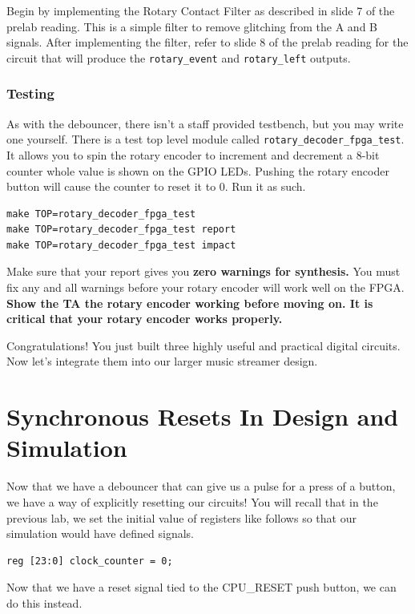 \documentclass[11pt]{article}
\begin{document}
Begin by implementing the Rotary Contact Filter as described in slide 7 of the prelab reading. This is a simple filter to remove glitching from the A and B signals. After implementing the filter, refer to slide 8 of the prelab reading for the circuit that will produce the \verb|rotary_event| and \verb|rotary_left| outputs.

\subsubsection{Testing}
As with the debouncer, there isn't a staff provided testbench, but you may write one yourself. There is a test top level module called \verb|rotary_decoder_fpga_test|. It allows you to spin the rotary encoder to increment and decrement a 8-bit counter whole value is shown on the GPIO LEDs. Pushing the rotary encoder button will cause the counter to reset it to 0. Run it as such.

\begin{verbatim}
make TOP=rotary_decoder_fpga_test
make TOP=rotary_decoder_fpga_test report
make TOP=rotary_decoder_fpga_test impact
\end{verbatim} 

Make sure that your report gives you \textbf{zero warnings for synthesis.} You must fix any and all warnings before your rotary encoder will work well on the FPGA.\\

\textbf{Show the TA the rotary encoder working before moving on. It is critical that your rotary encoder works properly.}

Congratulations! You just built three highly useful and practical digital circuits. Now let's integrate them into our larger music streamer design.

\section{Synchronous Resets In Design and Simulation}
Now that we have a debouncer that can give us a pulse for a press of a button, we have a way of explicitly resetting our circuits! You will recall that in the previous lab, we set the initial value of registers like follows so that our simulation would have defined signals.

\begin{verbatim}
reg [23:0] clock_counter = 0;
\end{verbatim}

Now that we have a reset signal tied to the CPU\_RESET push button, we can do this instead.
\end{document}
